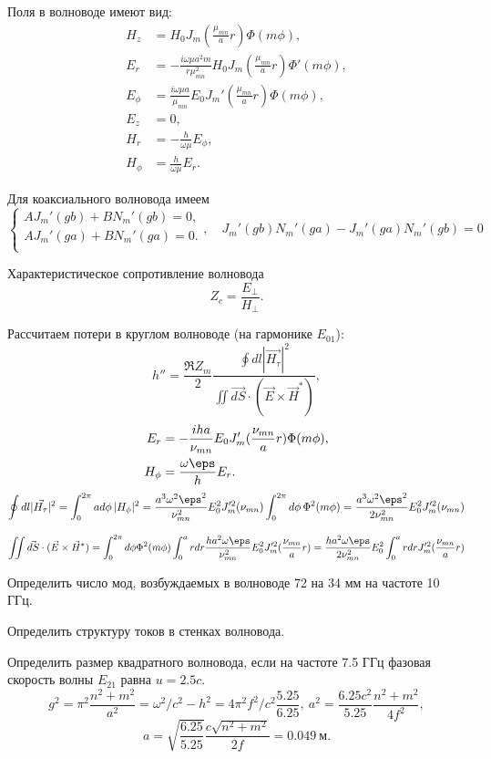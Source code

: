 Поля в волноводе имеют вид:
\begin{align*}
	H_z &= H_0 J_m(\frac{\mu_{mn}}{a}r)\Phi(m\phi),\\
	E_r &= -\frac{i\omega\mu a^2m}{r\mu_{mn}^2}H_0 J_m(\frac{\mu_{mn}}{a}r)\Phi'(m\phi),\\
	E_\phi &= \frac{i\omega\mu a}{\mu_{mn}}E_0 J_m'(\frac{\mu_{mn}}{a}r)\Phi(m\phi),\\
	E_z &= 0,\\
	H_r &= -\frac{h}{\omega\mu}E_\phi,\\
	H_\phi &= \frac{h}{\omega\mu}E_r.
\end{align*}

Для коаксиального волновода имеем
\[
	\begin{cases}
		AJ_m'(gb) + BN_m'(gb) = 0,\\
		AJ_m'(ga) + BN_m'(ga) = 0.\\
	\end{cases},
	\quad
	J_m'(gb)N_m'(ga) - J_m'(ga)N_m'(gb) = 0
\]

Характеристическое сопротивление волновода
\[
	Z_c = \frac{E_\perp}{H_\perp}.
\]

Рассчитаем потери в круглом волноводе (на гармонике \(E_{01}\)):
\[
	h'' = \frac{\Re Z_m}{2}\frac{\oint dl |\vec{H_\tau}|^2}{\iint \vec{dS}\cdot(\vec{E}\times\vec{H}^*)},
\]
\begin{align*}
	E_r &= -\frac{iha}{\nu_{mn}}E_0 J_m'(\frac{\nu_{mn}}{a}r)\Phi(m\phi),\\
	H_\phi &= \frac{\omega\eps}{h}E_r.
\end{align*}
\[
	\oint dl |\vec{H_\tau}|^2 = \int_0^{2\pi} a d\phi\,|H_\phi|^2 =
	\frac{a^3\omega^2\eps^2}{\nu_{mn}^2}E_0^2J_m'^2(\nu_{mn})\int_0^{2\pi} d\phi\,\Phi^2(m\phi) = \frac{a^3\omega^2\eps^2}{2\nu_{mn}^2}E_0^2J_m'^2(\nu_{mn})
\]

\[
	\iint \vec{dS}\cdot(\vec{E}\times\vec{H}^*) = \int_0^{2\pi}d\phi\Phi^2(m\phi)\int_0^a rdr \frac{ha^2\omega\eps}{\nu_{mn}^2}E_0^2J_m'^2(\frac{\nu_{mn}}{a}r)= \frac{ha^2\omega\eps}{2\nu_{mn}^2}E_0^2 \int_0^a rdrJ_m'^2(\frac{\nu_{mn}}{a}r)
\]

Определить число мод, возбуждаемых в волноводе 72 на 34 мм на частоте 10 ГГц.

Определить структуру токов в стенках волновода.

Определить размер квадратного волновода, если на частоте 7.5 ГГц фазовая скорость волны \(E_{21}\) равна \( u = 2.5c \).
\[
	g^2 = \pi^2\frac{n^2 + m^2}{a^2} = \omega^2/c^2 - h^2 = 4\pi^2f^2/c^2 \frac{5.25}{6.25},\ a^2 = \frac{6.25 c^2}{5.25}\frac{n^2 + m^2}{4f^2},
\]
\[
	a = \sqrt{\frac{6.25}{5.25}}\frac{c\sqrt{n^2 + m^2}}{2f} = 0.049~\text{м}.
\]

